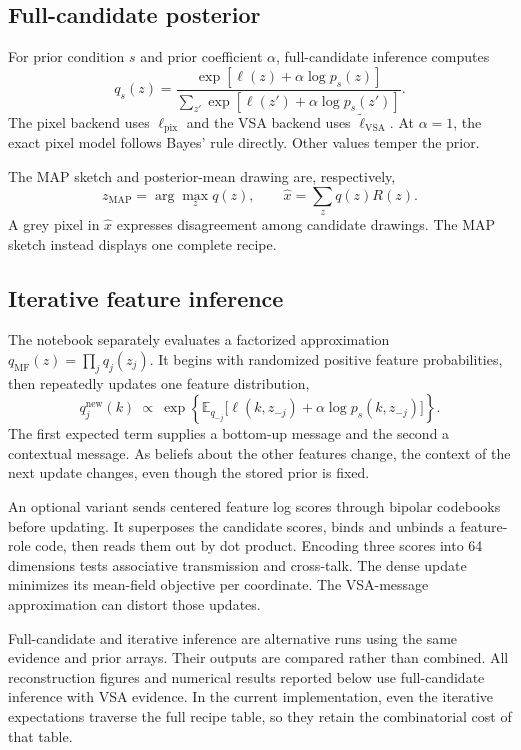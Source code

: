 \documentclass[11pt,letterpaper]{article}
\newcommand{\E}{\mathbb{E}}
\begin{document}
\subsection{Full-candidate posterior}
For prior condition $s$ and prior coefficient $\alpha$, full-candidate inference computes
\begin{equation}
q_s(z)=\frac{\exp[\ell(z)+\alpha\log p_s(z)]}
{\sum_{z'}\exp[\ell(z')+\alpha\log p_s(z')]}.
\label{eq:posterior}
\end{equation}
The pixel backend uses $\ell_{\mathrm{pix}}$ and the VSA backend uses $\widetilde\ell_{\mathrm{VSA}}$. At $\alpha=1$, the exact pixel model follows Bayes' rule directly. Other values temper the prior.

The MAP sketch and posterior-mean drawing are, respectively,
\begin{equation}
z_{\mathrm{MAP}}=\arg\max_z q(z),\qquad
\widehat x=\sum_zq(z)R(z).
\end{equation}
A grey pixel in $\widehat x$ expresses disagreement among candidate drawings. The MAP sketch instead displays one complete recipe.

\subsection{Iterative feature inference}
The notebook separately evaluates a factorized approximation $q_{\mathrm{MF}}(z)=\prod_jq_j(z_j)$. It begins with randomized positive feature probabilities, then repeatedly updates one feature distribution,
\begin{equation}
q_j^{\mathrm{new}}(k)\ \propto\
\exp\!\left\{\E_{q_{-j}}\big[
\ell(k,z_{-j})+\alpha\log p_s(k,z_{-j})\big]\right\}.
\label{eq:mf}
\end{equation}
The first expected term supplies a bottom-up message and the second a contextual message. As beliefs about the other features change, the context of the next update changes, even though the stored prior is fixed.

An optional variant sends centered feature log scores through bipolar codebooks before updating. It superposes the candidate scores, binds and unbinds a feature-role code, then reads them out by dot product. Encoding three scores into 64 dimensions tests associative transmission and cross-talk. The dense update minimizes its mean-field objective per coordinate. The VSA-message approximation can distort those updates.

Full-candidate and iterative inference are alternative runs using the same evidence and prior arrays. Their outputs are compared rather than combined. All reconstruction figures and numerical results reported below use full-candidate inference with VSA evidence. In the current implementation, even the iterative expectations traverse the full recipe table, so they retain the combinatorial cost of that table.
\end{document}
